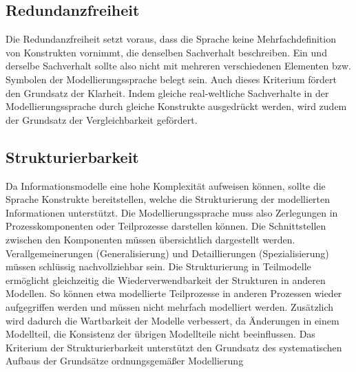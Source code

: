 \subsection{Redundanzfreiheit}
\label{ssc:Redundanzfreiheit}
Die Redundanzfreiheit setzt voraus, dass die Sprache keine Mehrfachdefinition von Konstrukten vornimmt, die denselben Sachverhalt beschreiben. Ein und derselbe Sachverhalt sollte also nicht mit mehreren verschiedenen Elementen bzw. Symbolen der Modellierungssprache belegt sein. Auch dieses Kriterium fördert den Grundsatz der Klarheit. Indem gleiche real-weltliche Sachverhalte in der Modellierungssprache durch gleiche Konstrukte ausgedrückt werden, wird zudem der Grundsatz der Vergleichbarkeit gefördert.
\subsection{Strukturierbarkeit}
\label{ssc:Strukturierbarkeit}
Da Informationsmodelle eine hohe Komplexität aufweisen können, sollte die Sprache Konstrukte bereitstellen, welche die Strukturierung der modellierten Informationen unterstützt. Die Modellierungssprache muss also Zerlegungen in Prozesskomponenten oder Teilprozesse darstellen können. Die Schnittstellen zwischen den Komponenten müssen übersichtlich dargestellt werden. Verallgemeinerungen (Generalisierung) und Detaillierungen (Spezialisierung) müssen schlüssig nachvollziehbar sein. Die Strukturierung in Teilmodelle ermöglicht gleichzeitig die Wiederverwendbarkeit der Strukturen in anderen Modellen. So können etwa modellierte Teilprozesse in anderen Prozessen wieder aufgegriffen werden und müssen nicht mehrfach modelliert werden. Zusätzlich wird dadurch die Wartbarkeit der Modelle verbessert, da Änderungen in einem Modellteil, die Konsistenz der übrigen Modellteile nicht beeinflussen. Das Kriterium der Strukturierbarkeit unterstützt den Grundsatz des systematischen Aufbaus der Grundsätze ordnungsgemäßer Modellierung